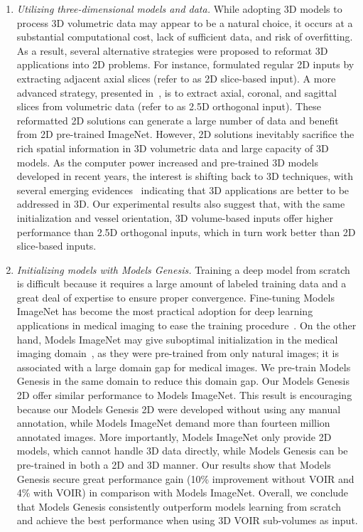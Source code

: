 \begin{enumerate}
    \item \textit{Utilizing three-dimensional models and data.}
    While adopting 3D models to process 3D volumetric data may appear to be a natural choice, it occurs at a substantial computational cost, lack of sufficient data, and risk of overfitting. As a result, several alternative strategies were proposed to reformat 3D applications into 2D problems. For instance, \citet{ben2016fully,sun2017multiphase} formulated regular 2D inputs by extracting adjacent axial slices (refer to as 2D slice-based input). A more advanced strategy, presented in~\citet{prasoon2013deep,roth2014new,roth2015improving}, is to extract axial, coronal, and sagittal slices from volumetric data (refer to as 2.5D orthogonal input). These reformatted 2D solutions can generate a large number of data and benefit from 2D pre-trained ImageNet. However, 2D solutions inevitably sacrifice the rich spatial information in 3D volumetric data and large capacity of 3D models. As the computer power increased and pre-trained 3D models developed in recent years, the interest is shifting back to 3D techniques, with several emerging evidences~\citep{zhou2021models,isensee2021nnu} indicating that 3D applications are better to be addressed in 3D. Our experimental results also suggest that, with the same initialization and vessel orientation, 3D volume-based inputs offer higher performance than 2.5D orthogonal inputs, which in turn work better than 2D slice-based inputs.
    
    \item \textit{Initializing models with Models Genesis.}
    Training a deep model from scratch is difficult because it requires a large amount of labeled training data and a great deal of expertise to ensure proper convergence. Fine-tuning Models ImageNet has become the most practical adoption for deep learning applications in medical imaging to ease the training procedure~\citep{shin2016deep,tajbakhsh2016convolutional}. On the other hand, Models ImageNet may give suboptimal initialization in the medical imaging domain~\citep{raghu2019transfusion}, as they were pre-trained from only natural images; it is associated with a large domain gap for medical images. We pre-train Models Genesis in the same domain to reduce this domain gap. Our Models Genesis 2D offer similar performance to Models ImageNet. This result is encouraging because our Models Genesis 2D were developed without using any manual annotation, while Models ImageNet demand more than fourteen million annotated images. More importantly, Models ImageNet only provide 2D models, which cannot handle 3D data directly, while Models Genesis can be pre-trained in both a 2D and 3D manner. Our results show that Models Genesis secure great performance gain (10\% improvement without VOIR and 4\% with VOIR) in comparison with Models ImageNet. Overall, we conclude that Models Genesis consistently outperform models learning from scratch and achieve the best performance when using 3D VOIR sub-volumes as input.
    
    
\end{enumerate}



